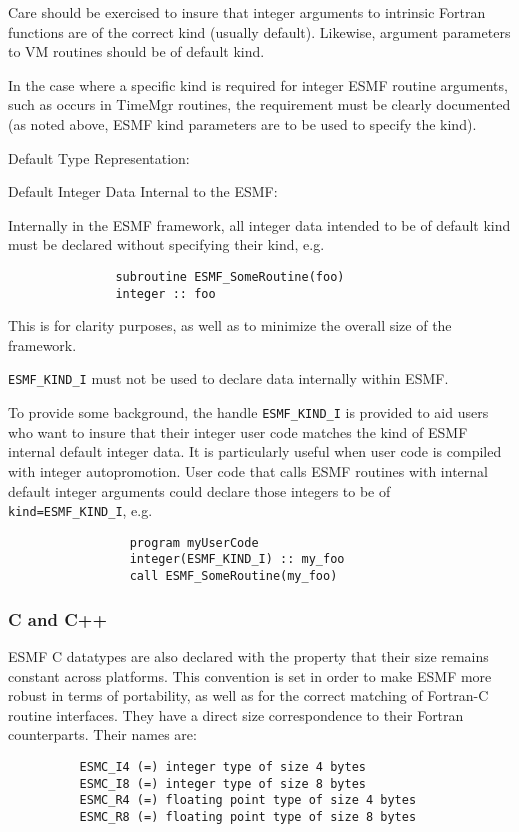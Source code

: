 Care should be exercised to insure that integer arguments to intrinsic Fortran functions are of the correct kind (usually default). Likewise, argument parameters to VM routines should be of default kind.

In the case where a specific kind is required for integer ESMF routine arguments, such as occurs in TimeMgr routines, the requirement must be clearly documented (as noted above, ESMF kind parameters are to be used to specify the kind).

Default Type Representation:

Default Integer Data Internal to the ESMF:

Internally in the ESMF framework, all integer data intended to be of default kind must be declared without specifying their kind, e.g.
\begin{verbatim}
               subroutine ESMF_SomeRoutine(foo)
               integer :: foo
\end{verbatim}
This is for clarity purposes, as well as to minimize the overall size of the framework.

{\tt ESMF\_KIND\_I} must not be used to declare data internally within ESMF.

To provide some background, the handle {\tt ESMF\_KIND\_I} is provided to aid users who want to insure that their integer user code matches the kind of ESMF internal default integer data. It is particularly useful when user code is compiled with integer autopromotion. User code that calls ESMF routines with internal default integer arguments could declare those integers to be of {\tt kind=ESMF\_KIND\_I}, e.g.
\begin{verbatim}
                 program myUserCode
                 integer(ESMF_KIND_I) :: my_foo
                 call ESMF_SomeRoutine(my_foo)
\end{verbatim}
\subsubsection{C and C++}

ESMF C datatypes are also declared with the property that their size remains constant across platforms. This convention is set in order to make ESMF more robust in terms of portability, as well as for the correct matching of Fortran-C routine interfaces. They have a direct size correspondence to their Fortran counterparts. Their names are:

\begin{verbatim}   
          ESMC_I4 (=) integer type of size 4 bytes
          ESMC_I8 (=) integer type of size 8 bytes
          ESMC_R4 (=) floating point type of size 4 bytes
          ESMC_R8 (=) floating point type of size 8 bytes
\end{verbatim}

